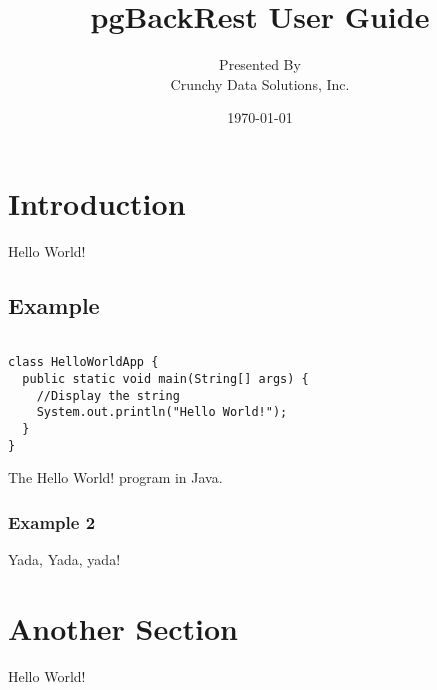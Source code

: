 \documentclass[titlepage,letterpaper,12pt]{article}
\begin{document}
\title{pgBackRest User Guide}
\author{Presented By\\
        Crunchy Data Solutions, Inc.}
\date{\today}
\maketitle

\renewcommand\contentsname{Table of Contents}
\tableofcontents
\newpage

\section{Introduction}

Hello World!

\subsection{Example}

\begin{program}
  \begin{verbatim}

class HelloWorldApp {
  public static void main(String[] args) {
    //Display the string
    System.out.println("Hello World!");
  }
}
\end{verbatim}
  \caption{The Hello World! program in Java.}
\end{program}

\subsubsection{Example 2}

Yada, Yada, yada!

\section{Another Section}

Hello World!
\end{document}
